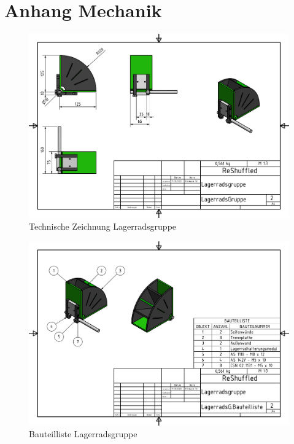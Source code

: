 \renewcommand\appendixname{Anhang}
\renewcommand\appendixpagename{Anhang}
\renewcommand\appendixtocname{Anhang}

\lohead{}

\appendix
\begingroup
\makeatletter
\let\ps@plain\ps@empty
\appendixpage
\makeatother
\endgroup

\chapter{Anhang Mechanik}

\begin{figure}
    \centering
    \includegraphics[scale=0.85,page=1, rotate=90]{fig/mech/LagerradsGruppe.pdf}
    \caption{Technische Zeichnung Lagerradsgruppe}
\end{figure}

\begin{figure}
    \centering
    \includegraphics[scale=0.85,page=1, rotate=90]{fig/mech/LagerradsGBauteilliste.pdf}
    \caption{Bauteilliste Lagerradsgruppe}
\end{figure}

